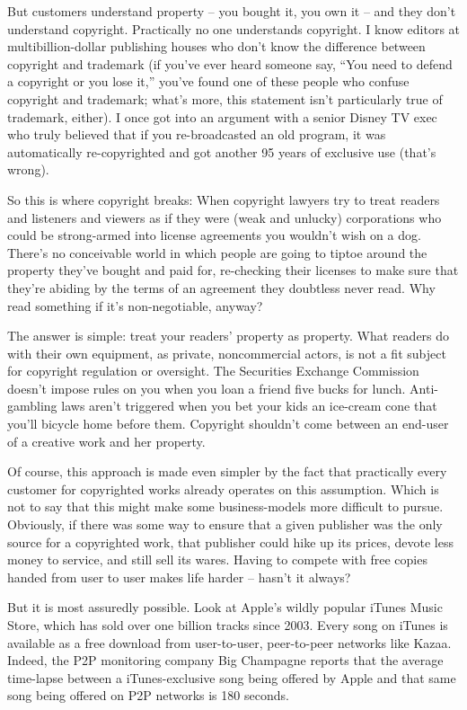 But customers understand property -- you bought it, you own it --
and they don't understand copyright. Practically no one understands
copyright. I know editors at multibillion-dollar publishing houses
who don't know the difference between copyright and trademark (if
you've ever heard someone say, ``You need to defend a copyright or
you lose it,'' you've found one of these people who confuse
copyright and trademark; what's more, this statement isn't
particularly true of trademark, either). I once got into an
argument with a senior Disney TV exec who truly believed that if
you re-broadcasted an old program, it was automatically
re-copyrighted and got another 95 years of exclusive use (that's
wrong).

So this is where copyright breaks: When copyright lawyers try to
treat readers and listeners and viewers as if they were (weak and
unlucky) corporations who could be strong-armed into license
agreements you wouldn't wish on a dog. There's no conceivable world
in which people are going to tiptoe around the property they've
bought and paid for, re-checking their licenses to make sure that
they're abiding by the terms of an agreement they doubtless never
read. Why read something if it's non-negotiable, anyway?

The answer is simple: treat your readers' property as property.
What readers do with their own equipment, as private, noncommercial
actors, is not a fit subject for copyright regulation or oversight.
The Securities Exchange Commission doesn't impose rules on you when
you loan a friend five bucks for lunch. Anti-gambling laws aren't
triggered when you bet your kids an ice-cream cone that you'll
bicycle home before them. Copyright shouldn't come between an
end-user of a creative work and her property.

Of course, this approach is made even simpler by the fact that
practically every customer for copyrighted works already operates
on this assumption. Which is not to say that this might make some
business-models more difficult to pursue. Obviously, if there was
some way to ensure that a given publisher was the only source for a
copyrighted work, that publisher could hike up its prices, devote
less money to service, and still sell its wares. Having to compete
with free copies handed from user to user makes life harder --
hasn't it always?

But it is most assuredly possible. Look at Apple's wildly popular
iTunes Music Store, which has sold over one billion tracks since
2003. Every song on iTunes is available as a free download from
user-to-user, peer-to-peer networks like Kazaa. Indeed, the P2P
monitoring company Big Champagne reports that the average
time-lapse between a iTunes-exclusive song being offered by Apple
and that same song being offered on P2P networks is 180 seconds.


